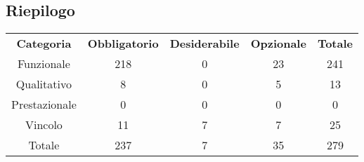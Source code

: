 \subsection{Riepilogo}

\begin{table}[H]
	\centering
	\begin{tabular}{c c c c c}
		\rowcolor{I}
		\color{white} \textbf{Categoria} &\color{white} \textbf{Obbligatorio} & \color{white}\textbf{Desiderabile} & \color{white}\textbf{Opzionale} & \color{white} \textbf{Totale} \\
		Funzionale & 218& 0& 23 & 241\\
		Qualitativo & 8&0 & 5 & 13\\
		Prestazionale &0 &0 &0 & 0\\
		Vincolo &11 &7 &7 & 25\\
		Totale & 237 & 7 & 35 &279 \\
	\end{tabular}
\end{table}
